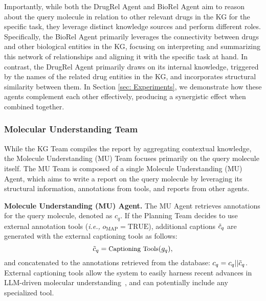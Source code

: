 Importantly, while both the DrugRel Agent and BioRel Agent aim to reason about the query molecule in relation to other relevant drugs in the KG for the specific task, they leverage distinct knowledge sources and perform different roles. 
Specifically, the BioRel Agent primarily leverages the connectivity between drugs and other biological entities in the KG, focusing on interpreting and summarizing this network of relationships and aligning it with the specific task at hand. 
In contrast, the DrugRel Agent primarily draws on its internal knowledge, triggered by the names of the related drug entities in the KG, and incorporates structural similarity between them. 
In Section \ref{sec: Experiments}, we demonstrate how these agents complement each other effectively, producing a synergistic effect when combined together.


\subsubsection{Molecular Understanding Team}
\label{sec: MolecualrUnderstandingTeam}

While the KG Team compiles the report by aggregating contextual knowledge, 
the Molecule Understanding (MU) Team focuses primarily on the query molecule itself.
The MU Team is composed of a single  Molecule Understanding (MU) Agent, which aims to write a report on the query molecule by leveraging its structural information, annotations from tools, and reports from other agents.

\noindent \textbf{Molecule Understanding (MU) Agent.}
The MU Agent retrieves annotations for the query molecule, denoted as $c_q$. If the Planning Team decides to use external annotation tools (\emph{i.e.,} $o_{\text{MAP}} = \text{TRUE}$), additional captions $ \Tilde{c}_q$ are generated with the external captioning tools as follows:
\begin{equation} 
\small
    \Tilde{c}_{q} = \text{Captioning Tools}(g_q),
    \vspace{-5pt}
\end{equation}
and concatenated to the annotations retrieved from the database: $c_{q} = c_{q} || \Tilde{c}_{q}$. 
External captioning tools allow the system to easily harness recent advances in LLM-driven molecular understanding~\cite{pei2023biot5,yu2024llasmol}, and can potentially include any specialized tool.

